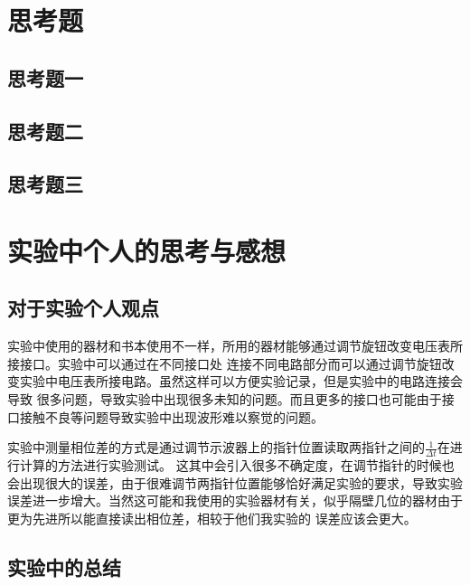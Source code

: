 \documentclass{ctexart}
\begin{document}






\section{思考题}
  \subsection{思考题一}

  \subsection{思考题二}

  \subsection{思考题三}


\section{实验中个人的思考与感想}
  \subsection{对于实验个人观点}
  实验中使用的器材和书本使用不一样，所用的器材能够通过调节旋钮改变电压表所接接口。实验中可以通过在不同接口处
  连接不同电路部分而可以通过调节旋钮改变实验中电压表所接电路。虽然这样可以方便实验记录，但是实验中的电路连接会导致
  很多问题，导致实验中出现很多未知的问题。而且更多的接口也可能由于接口接触不良等问题导致实验中出现波形难以察觉的问题。

  实验中测量相位差的方式是通过调节示波器上的指针位置读取两指针之间的$\frac{1}{\Delta t}$在进行计算的方法进行实验测试。
  这其中会引入很多不确定度，在调节指针的时候也会出现很大的误差，由于很难调节两指针位置能够恰好满足实验的要求，导致实验
  误差进一步增大。当然这可能和我使用的实验器材有关，似乎隔壁几位的器材由于更为先进所以能直接读出相位差，相较于他们我实验的
  误差应该会更大。
  \subsection{实验中的总结}
\end{document}
